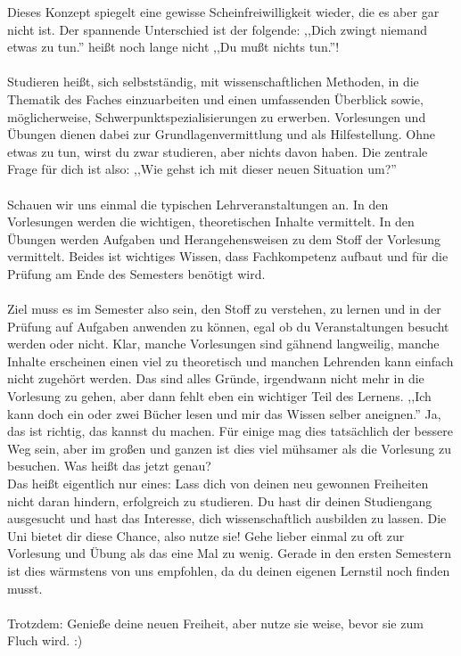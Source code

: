         Dieses Konzept spiegelt eine gewisse Scheinfreiwilligkeit
	wieder, die es aber gar nicht ist. Der spannende Unterschied ist
	der folgende: ,,Dich zwingt niemand etwas zu tun.'' heißt noch
	lange nicht ,,Du mußt nichts tun.''! \\\\
Studieren heißt, sich selbstständig, mit wissenschaftlichen Methoden, in
die Thematik des Faches einzuarbeiten und einen umfassenden Überblick
sowie, möglicherweise, Schwerpunktspezialisierungen zu erwerben.
Vorlesungen und Übungen dienen dabei zur Grundlagenvermittlung und als
Hilfestellung. Ohne etwas zu tun, wirst du zwar studieren, aber nichts
davon haben. Die zentrale Frage für dich ist also: ,,Wie gehst ich  mit
dieser neuen Situation um?''\\\\
 Schauen wir uns einmal die typischen Lehrveranstaltungen an. 
 In den Vorlesungen werden die wichtigen, theoretischen Inhalte vermittelt. 
 In den Übungen werden Aufgaben und Herangehensweisen zu dem Stoff der Vorlesung vermittelt. 
 Beides ist wichtiges Wissen, dass Fachkompetenz aufbaut und für die
 Prüfung am Ende des Semesters benötigt wird.\\\\
Ziel muss es im Semester also sein, den Stoff zu verstehen, zu lernen und in der Prüfung auf Aufgaben 
anwenden zu können, egal ob du Veranstaltungen besucht werden oder
nicht. Klar, manche Vorlesungen sind gähnend langweilig, manche Inhalte
erscheinen einen viel zu theoretisch und manchen Lehrenden kann einfach nicht zugehört werden. 
Das sind alles Gründe, irgendwann nicht mehr in die Vorlesung zu gehen, aber dann fehlt eben ein wichtiger Teil des Lernens. 
,,Ich kann doch ein oder zwei Bücher lesen und mir das Wissen selber aneignen.''
 Ja, das ist richtig, das kannst du machen. Für einige mag dies tatsächlich der bessere Weg sein, aber im großen und ganzen ist dies viel mühsamer als die Vorlesung zu besuchen.       
        Was heißt das jetzt genau? \\
Das heißt eigentlich nur eines: Lass dich von deinen neu gewonnen Freiheiten nicht daran hindern, erfolgreich zu studieren. Du hast dir deinen Studiengang ausgesucht und hast das Interesse, dich wissenschaftlich ausbilden zu lassen. Die Uni bietet dir diese Chance, also nutze sie!
        Gehe lieber einmal zu oft zur Vorlesung und Übung als das eine Mal zu
	wenig. Gerade in den ersten Semestern ist dies wärmstens von uns
	empfohlen, da du deinen eigenen Lernstil noch finden
	musst.\\\\
        Trotzdem: Genieße deine neuen Freiheit, aber nutze sie weise, bevor sie
        zum Fluch wird. :)
